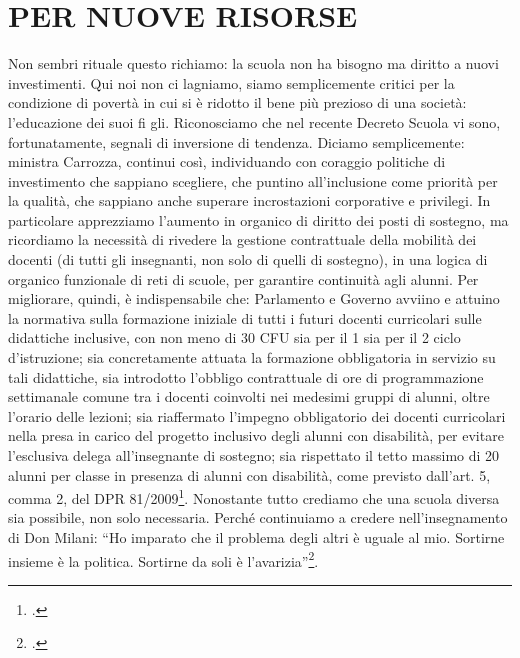 \section*{PER NUOVE RISORSE}
Non sembri rituale questo richiamo: la scuola non ha bisogno ma diritto a nuovi investimenti. Qui noi non ci lagniamo, siamo semplicemente critici per la condizione di povertà in cui si è ridotto il bene più prezioso di una società: l'educazione dei suoi fi gli. Riconosciamo che nel recente Decreto Scuola vi sono, fortunatamente, segnali di inversione di
tendenza. Diciamo semplicemente: ministra Carrozza, continui così, individuando con
coraggio politiche di investimento che sappiano scegliere, che puntino all'inclusione
come priorità per la qualità, che sappiano anche superare incrostazioni corporative e
privilegi. In particolare apprezziamo l'aumento in organico di diritto dei posti di sostegno, ma ricordiamo la necessità di rivedere la gestione contrattuale della mobilità dei
docenti (di tutti gli insegnanti, non solo di quelli di sostegno), in una logica di organico
funzionale di reti di scuole, per garantire continuità agli alunni.
Per migliorare, quindi, è indispensabile che:
Parlamento e Governo avviino e attuino la normativa sulla formazione iniziale di tutti i
futuri docenti curricolari sulle didattiche inclusive, con non meno di 30 CFU sia per il 1
sia per il 2 ciclo d'istruzione;
sia concretamente attuata la formazione obbligatoria in servizio su tali didattiche, sia introdotto l'obbligo contrattuale di ore di programmazione settimanale comune tra i
docenti coinvolti nei medesimi gruppi di alunni, oltre l'orario delle lezioni;
sia riaffermato l'impegno obbligatorio dei docenti curricolari nella presa in carico del
progetto inclusivo degli alunni con disabilità, per evitare l'esclusiva delega all'insegnante di sostegno;
sia rispettato il tetto massimo di 20 alunni per classe in presenza di alunni con disabilità,
come previsto dall'art. 5, comma 2, del DPR 81/2009\footcite{DPR_81_2009}.
Nonostante tutto crediamo che una scuola diversa sia possibile, non solo necessaria.
Perché continuiamo a credere nell'insegnamento di Don Milani: “Ho imparato che il
problema degli altri è uguale al mio. Sortirne insieme è la politica. Sortirne da soli è l'avarizia”\footcite{AAVV2013}.

